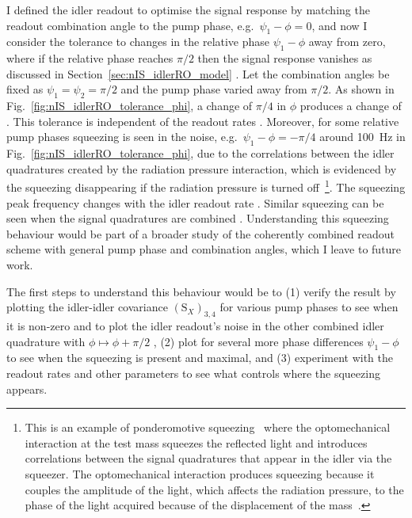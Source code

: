 I defined the idler readout to optimise the signal response by matching the readout combination angle to the pump phase, e.g.\ $\psi_1-\phi=0$, and now I consider the tolerance to changes in the relative phase $\psi_1-\phi$ away from zero, where if the relative phase reaches $\pi/2$ then the signal response vanishes as discussed in Section~\ref{sec:nIS_idlerRO_model} .
Let the combination angles be fixed as $\psi_1=\psi_2=\pi/2$ and the pump phase varied away from $\pi/2$. As shown in Fig.~\ref{fig:nIS_idlerRO_tolerance_phi}, a change of $\pi/4$ in $\phi$  produces a change of . This tolerance is independent of the readout rates  .
Moreover, for some relative pump phases squeezing is seen in the noise, e.g.\ $\psi_1-\phi=-\pi/4$ around 100~Hz in Fig.~\ref{fig:nIS_idlerRO_tolerance_phi}, due to the correlations between the idler quadratures created by the radiation pressure interaction, which is evidenced by the squeezing disappearing if the radiation pressure is turned off~\footnote{This is an example of ponderomotive squeezing~\cite{} where the optomechanical interaction at the test mass squeezes the reflected light and introduces correlations between the signal quadratures that appear in the idler via the squeezer. The optomechanical interaction produces squeezing because it couples the amplitude of the light, which affects the radiation pressure, to the phase of the light acquired because of the displacement of the mass~\cite{}. }.
The squeezing peak frequency changes with the idler readout rate .
Similar squeezing can be seen when the signal quadratures are combined . Understanding this squeezing behaviour would be part of a broader study of the coherently combined readout scheme with general pump phase and combination angles, which I leave to future work.

The first steps to understand this behaviour would be to (1) verify the result by plotting the idler-idler covariance $(\text{S}_X)_{3,4}$ for various pump phases to see when it is non-zero and to plot the idler readout's noise in the other combined idler quadrature with $\phi\mapsto\phi+\pi/2$ , (2) plot for several more phase differences $\psi_1-\phi$ to see when the squeezing is present and maximal, and (3) experiment with the readout rates and other parameters to see what controls where the squeezing appears.

